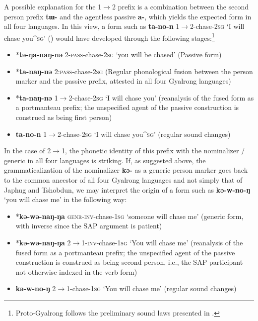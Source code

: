\documentclass[oneside,a4paper,11pt]{article}
\newcommand{\ipa}[1]{\textbf{\phon\mbox{#1}}} %
\begin{document}
A possible explanation for the 1$\rightarrow$2  prefix is a combination between the second person prefix \ipa{tɯ-} and the agentless passive \ipa{a-}, which yields the expected form in all four languages. In this view, a form such as \ipa{ta-no-n} 1$\rightarrow$2-chase-\textsc{2sg} `I will chase you^{\textsc{sg}}' (\citealt[219]{linxr93jiarong}) would have developed through the following stages:\footnote{Proto-Gyalrong follows the preliminary sound laws presented in \citet{jacques04these}.}

\begin{itemize}
\item *\ipa{tə-ŋa-naŋ-nə}  2-\textsc{pass}-chase-\textsc{2sg} `you will be chased' (Passive form)
\item *\ipa{ta-naŋ-nə}  2:\textsc{pass}-chase-\textsc{2sg} (Regular phonological fusion between the person marker and the passive prefix, attested in all four Gyalrong languages)  
\item  *\ipa{ta-naŋ-nə}  1$\rightarrow$2-chase-\textsc{2sg} `I will chase you' (reanalysis of the fused form as a portmanteau prefix; the unspecified agent of the passive construction is construed as being first person)
\item  \ipa{ta-no-n} 1$\rightarrow$2-chase-\textsc{2sg} `I will chase you^{\textsc{sg}}' (regular sound changes)
\end{itemize}


In the case of 2$\rightarrow$1, the phonetic identity of this prefix with the nominalizer / generic in all four languages is striking. If, as suggested above, the grammaticalization of the nominalizer \ipa{kə-} as a generic person marker goes back to the common ancestor of all four Gyalrong languages and not simply that of Japhug and Tshobdun, we may interpret the origin of a form such as \ipa{kə-w-no-ŋ} `you will chase me' in the following way:


\begin{itemize}
\item *\ipa{kə-wə-naŋ-ŋa}  \textsc{genr}-\textsc{inv}-chase-\textsc{1sg} `someone will chase me' (generic form, with inverse since the SAP argument is patient)
\item  *\ipa{kə-wə-naŋ-ŋa}  2$\rightarrow$1-\textsc{inv}-chase-\textsc{1sg} `You will chase me' (reanalysis of the fused form as a portmanteau prefix; the unspecified agent of the passive construction is construed as being second person, i.e., the SAP participant not otherwise indexed in the verb form)
\item  \ipa{kə-w-no-ŋ} 2$\rightarrow$1-chase-\textsc{1sg} `You will chase me'  (regular sound changes)
\end{itemize}
\end{document}
